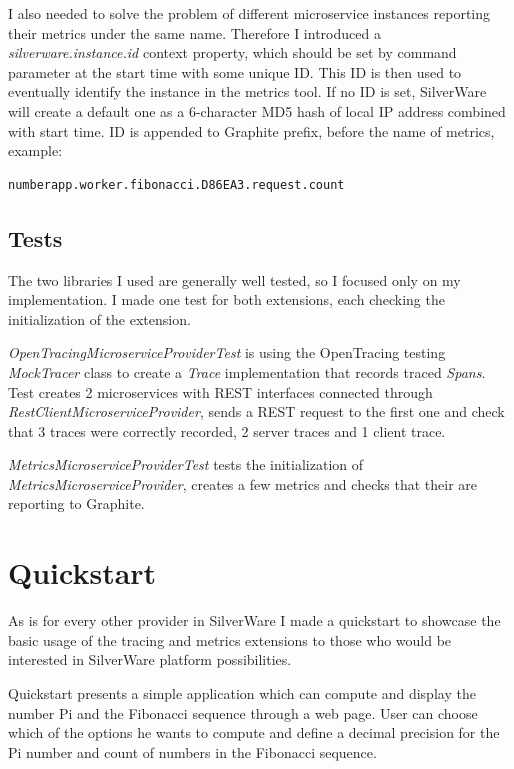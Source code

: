 \documentclass[12pt,oneside]{fithesis2}
\begin{document}
I also needed to solve the problem of different microservice instances reporting their metrics under the same name. Therefore I introduced a \textit{silverware.instance.id} context property, which should be set by command parameter at the start time with some unique ID. This ID is then used to eventually identify the instance in the metrics tool. If no ID is set, SilverWare will create a default one as a 6-character MD5 hash of local IP address combined with start time. ID is appended to Graphite prefix, before the name of metrics, example:
\newline

\begin{verbatim}
numberapp.worker.fibonacci.D86EA3.request.count
\end{verbatim}
\newpage

\section{Tests}

The two libraries I used are generally well tested, so I focused only on my implementation. I made one test for both extensions, each checking the initialization of the extension.

\textit{OpenTracingMicroserviceProviderTest} is using the OpenTracing testing \textit{MockTracer} class to create a \textit{Trace} implementation that records traced \textit{Spans}. Test creates 2 microservices with REST interfaces connected through \textit{RestClientMicroserviceProvider}, sends a REST request to the first one and check that 3 traces were correctly recorded, 2 server traces and 1 client trace.

\textit{MetricsMicroserviceProviderTest} tests the initialization of \textit{MetricsMicroserviceProvider}, creates a few metrics and checks that their are reporting to Graphite.

\chapter{Quickstart}

As is for every other provider in SilverWare I made a quickstart to showcase the basic usage of the tracing and metrics extensions to those who would be interested in SilverWare platform possibilities.

Quickstart presents a simple application which can compute and display the number Pi and the Fibonacci sequence through a web page. User can choose which of the options he wants to compute and define a decimal precision for the Pi number and count of numbers in the Fibonacci sequence.
\end{document}
